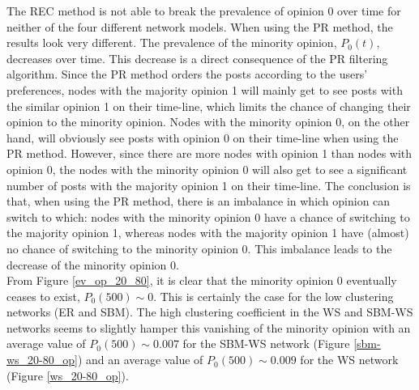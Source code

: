 \documentclass[11 pt , letterpaper , twoside , openright]{book}
\begin{document}
The REC method is not able to break the prevalence of opinion 0 over time for neither of the four different network models. When using the PR method, the results look very different. The prevalence of the minority opinion, $P_0(t)$, decreases over time. This decrease is a direct consequence of the PR filtering algorithm. Since the PR method orders the posts according to the users' preferences, nodes with the majority opinion 1 will mainly get to see posts with the similar opinion 1 on their time-line, which limits the chance of changing their opinion to the minority opinion. Nodes with the minority opinion 0, on the other hand, will obviously see posts with opinion 0 on their time-line when using the PR method. However, since there are more nodes with opinion 1 than nodes with opinion 0, the nodes with the minority opinion 0 will also get to see a significant number of posts with the majority opinion 1 on their time-line. The conclusion is that, when using the PR method, there is an imbalance in which opinion can switch to which: nodes with the minority opinion 0 have a chance of switching to the majority opinion 1, whereas nodes with the majority opinion 1 have (almost) no chance of switching to the minority opinion 0. This imbalance leads to the decrease of the minority opinion 0.\\
\newline
From Figure \ref{ev_op_20_80}, it is clear that the minority opinion 0 eventually ceases to exist, $P_0(500) \sim 0$. This is certainly the case for the low clustering networks (ER and SBM). The high clustering coefficient in the WS and SBM-WS networks seems to slightly hamper this vanishing of the minority opinion with an average value of $P_0(500) \sim 0.007$ for the SBM-WS network (Figure \ref{sbm-ws_20-80_op}) and an average value of $P_0(500) \sim 0.009$ for the WS network (Figure \ref{ws_20-80_op}).\\ 
\end{document}
